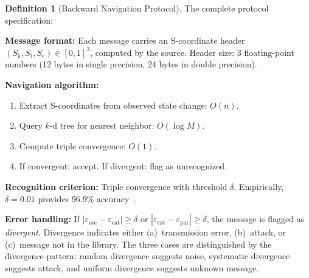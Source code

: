 \documentclass[11pt,twocolumn,a4paper]{article}
\theoremstyle{definition}
\newtheorem{definition}[theorem]{Definition}
\newcommand{\Sk}{S_{\mathrm{k}}}
\newcommand{\St}{S_{\mathrm{t}}}
\newcommand{\Se}{S_{\mathrm{e}}}
\newcommand{\eps}{\varepsilon}
\begin{document}
\begin{definition}[Backward Navigation Protocol]\label{def:protocol}
The complete protocol specification:

\textbf{Message format:} Each message carries an S-coordinate header
$(\Sk, \St, \Se) \in [0,1]^3$, computed by the source. Header size: 3 floating-point
numbers (12 bytes in single precision, 24 bytes in double precision).

\textbf{Navigation algorithm:}
\begin{enumerate}
  \item Extract S-coordinates from observed state change: $O(n)$.
  \item Query $k$-d tree for nearest neighbor: $O(\log M)$.
  \item Compute triple convergence: $O(1)$.
  \item If convergent: accept. If divergent: flag as unrecognized.
\end{enumerate}

\textbf{Recognition criterion:} Triple convergence with threshold $\delta$.
Empirically, $\delta = 0.01$ provides 96.9\% accuracy~\cite{sachikonye2025d}.

\textbf{Error handling:} If $|\eps_{\mathrm{osc}} - \eps_{\mathrm{cat}}| \geq \delta$ or
$|\eps_{\mathrm{cat}} - \eps_{\mathrm{par}}| \geq \delta$, the message is flagged as
\emph{divergent}. Divergence indicates either (a)~transmission error, (b)~attack, or
(c)~message not in the library. The three cases are distinguished by the divergence
pattern: random divergence suggests noise, systematic divergence suggests attack,
and uniform divergence suggests unknown message.
\end{definition}
\end{document}
